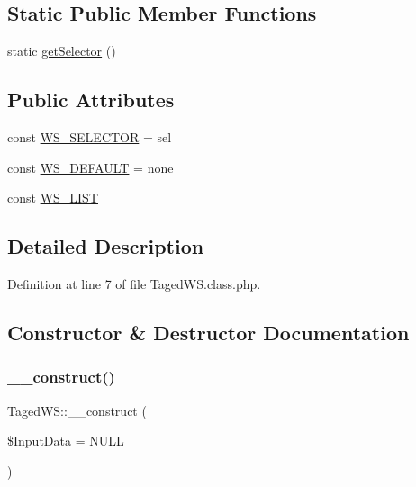 \subsection*{Static Public Member Functions}
\begin{DoxyCompactItemize}
\item 
static \hyperlink{class_taged_w_s_a6b2d6df992d84326e2aa6f2a42f74548}{get\+Selector} ()
\end{DoxyCompactItemize}
\subsection*{Public Attributes}
\begin{DoxyCompactItemize}
\item 
const \hyperlink{class_taged_w_s_a7d8cb9e784db33909bf14633a126455c}{W\+S\+\_\+\+S\+E\+L\+E\+C\+T\+OR} = \textquotesingle{}sel\textquotesingle{}
\item 
const \hyperlink{class_taged_w_s_ae4e78af248665b98dc686301ec4aaecb}{W\+S\+\_\+\+D\+E\+F\+A\+U\+LT} = \textquotesingle{}none\textquotesingle{}
\item 
const \hyperlink{class_taged_w_s_aeb078fb0a692eb87d8fba680e1dd0a03}{W\+S\+\_\+\+L\+I\+ST}
\end{DoxyCompactItemize}


\subsection{Detailed Description}


Definition at line 7 of file Taged\+W\+S.\+class.\+php.



\subsection{Constructor \& Destructor Documentation}
\mbox{\label{class_taged_w_s_a4d93934deb289278e270c852f6c963dc}} 
\subsubsection{\texorpdfstring{\+\_\+\+\_\+construct()}{\_\_construct()}}
{\footnotesize\ttfamily Taged\+W\+S\+::\+\_\+\+\_\+construct (\begin{DoxyParamCaption}\item[{}]{\$\+Input\+Data = {\ttfamily NULL} }\end{DoxyParamCaption})}



